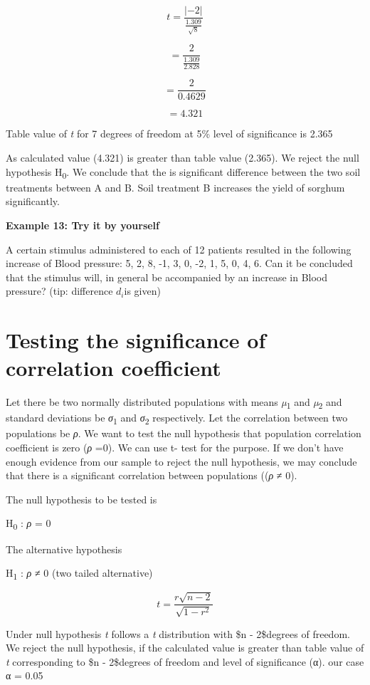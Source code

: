 \documentclass[
]{book}
\begin{document}
\[t = \frac{| - 2|}{\frac{1.309}{\sqrt{8}}}\]

\[= \frac{2}{\frac{1.309}{2.828}}\]

\[= \frac{2}{0.4629}\]

\[= 4.321\]

Table value of \emph{t} for 7 degrees of freedom at 5\% level of significance is 2.365

As calculated value (4.321) is greater than table value (2.365). We reject the null hypothesis H\textsubscript{0}. We conclude that the is significant difference between the two soil treatments between A and B. Soil treatment B increases the yield of sorghum significantly.

\textbf{Example 13: Try it by yourself}

A certain stimulus administered to each of 12 patients resulted in the following increase of Blood pressure: 5, 2, 8, -1, 3, 0, -2, 1, 5, 0, 4, 6. Can it be concluded that the stimulus will, in general be accompanied by an increase in Blood pressure? (tip: difference \(d_{i}\)is given)

\hypertarget{testing-the-significance-of-correlation-coefficient}{%
\section{Testing the significance of correlation coefficient}\label{testing-the-significance-of-correlation-coefficient}}

Let there be two normally distributed populations with means \emph{µ}\textsubscript{1} and \emph{µ}\textsubscript{2} and standard deviations be \emph{σ}\textsubscript{1} and \emph{σ}\textsubscript{2} respectively. Let the correlation between two populations be \emph{ρ}. We want to test the null hypothesis that population correlation coefficient is zero (\emph{ρ} =0). We can use t- test for the purpose. If we don't have enough evidence from our sample to reject the null hypothesis, we may conclude that there is a significant correlation between populations ((\emph{ρ} ≠ 0).

The null hypothesis to be tested is

H\textsubscript{0} : \emph{ρ} = 0

The alternative hypothesis

H\textsubscript{1} : \emph{ρ} ≠ 0 (two tailed alternative)

\[t = \frac{r\sqrt{n - 2}}{\sqrt{1 - r^{2}}}\]

Under null hypothesis \emph{t} follows a \emph{t} distribution with \$n - 2\$degrees of freedom. We reject the null hypothesis, if the calculated value is greater than table value of \emph{t} corresponding to \$n - 2\$degrees of freedom and level of significance (α). our case α = 0.05
\end{document}
